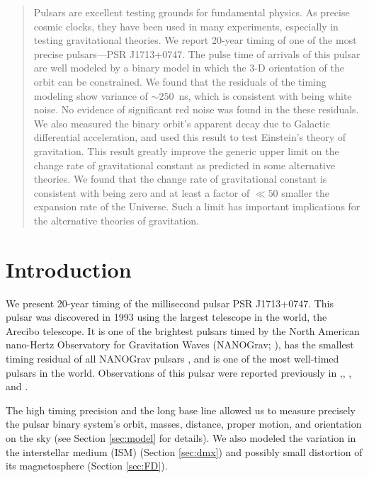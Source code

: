 
\begin{abstract}
Pulsars are excellent testing grounds for fundamental physics. As precise
cosmic clocks, they have been used in many experiments, especially in testing
gravitational theories. We report 20-year timing of one of the most precise
pulsars---PSR J1713+0747. The pulse time of arrivals of this pulsar are well
modeled by a binary model in which the 3-D orientation of the orbit can be
constrained. We found that the residuals of the timing modeling show variance
of $\sim 250$~ns, which is consistent with
being white noise. No evidence of significant red noise was found in the
these residuals. We also measured the binary orbit's apparent decay due to 
Galactic differential acceleration, and used this result to test Einstein's 
theory of gravitation. This result
greatly improve the generic upper limit on the change rate of gravitational
constant as predicted in some alternative theories. We found that the
change rate of gravitational constant is consistent with being zero and at 
least a factor of $\ll50$ smaller the expansion rate of the Universe. Such a
limit has important implications for the alternative theories of gravitation.
\end{abstract}


\section{Introduction}
\label{sec:intro}
\linenumbers
We present 20-year timing of the millisecond pulsar PSR J1713+0747. This pulsar was discovered in 1993 \citep{fwc93} using the largest telescope in the world, the Arecibo telescope. It is one of the brightest pulsars timed by the
North American nano-Hertz Observatory for Gravitation Waves (NANOGrav;
\citealt{ndf+12, dfg+13}), has the smallest timing residual of all NANOGrav
pulsars \citep{dfg+13}, and is one of the most well-timed pulsars in the world.
Observations of this pulsar were reported previously in
\citealt{cfw94},\citealt{ vb03}, \citealt{sns+05}, \citealt{hbo06} and \citealt{ver09}.

The high timing precision and the long base line allowed us to measure 
precisely 
the pulsar binary system's orbit, masses, distance, proper motion, 
and orientation on the sky (see Section \ref{sec:model} for
details). We also modeled the variation in the interstellar medium (ISM)
(Section \ref{sec:dmx}) and possibly small distortion of its magnetosphere (Section
\ref{sec:FD}). 

